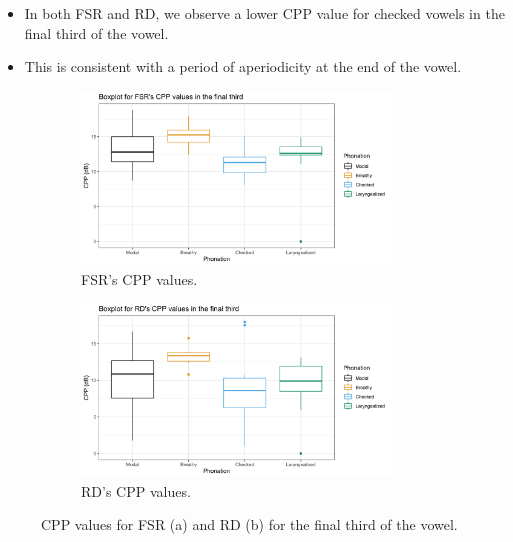\documentclass[12pt, letterpaper]{article}
\begin{document}
\begin{itemize}
	\item In both FSR and RD, we observe a lower CPP value for checked vowels in the final third of the vowel. 
	\item This is consistent with a period of aperiodicity at the end of the vowel. 
\end{itemize}
\begin{figure}[!h]
	\centering
	\begin{subfigure}{.5\textwidth}
		\centering
		\includegraphics[width=0.9\textwidth]{../mean_FSR_cpp_third.png}
		\caption{FSR's CPP values.}
		\label{fig:FSRcppthird} 
	\end{subfigure}%
	\begin{subfigure}{.5\textwidth}
		\centering
		\includegraphics[width=0.9\textwidth]{../mean_RD_cpp_third.png}
		\caption{RD's CPP values.}
		\label{fig:RDcppthird} 
	\end{subfigure}
	\caption{CPP values for FSR (a) and RD (b) for the final third of the vowel. }
	\label{fig:cppthird}
\end{figure}

\end{document}
